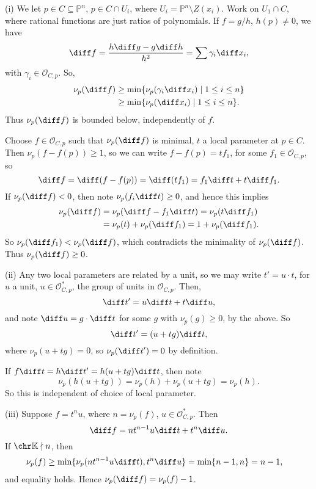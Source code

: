 \documentclass[12pt]{article}
\begin{document}
\begin{proofbox}
	(i) We let $p \in C \subseteq \mathbb{P}^n$, $p \in C \cap U_i$, where $U_i = \mathbb{P}^n \setminus Z(x_i)$. Work on $U_1 \cap C, $ where rational functions are just ratios of polynomials. If $f = g/h$, $h(p) \neq 0$, we have
	\[
	\diff f = \frac{h \diff g - g \diff h}{h^2} = \sum \gamma_i \diff x_i,
	\]
	with $\gamma_i \in \mathcal{O}_{C, p}$. So,
	\begin{align*}
		\nu_p(\diff f) & \geq \min\{ \nu_p(\gamma_i \diff x_i) \mid 1 \leq i \leq n\} \\
			       &\geq \min \{ \nu_p(\diff x_i) \mid 1 \leq i \leq n \}.
	\end{align*}
	Thus $\nu_p(\diff f)$ is bounded below, independently of $f$.

	Choose $f \in \mathcal{O}_{C, p}$ such that $\nu_p(\diff f)$ is minimal, $t$ a local parameter at $p \in C$. Then $\nu_p(f - f(p)) \geq 1$, so we can write $f - f(p) = t f_1$, for some $f_1 \in \mathcal{O}_{C, p}$, so
	\[
	\diff f=  \diff(f - f(p)) = \diff (t f_1) = f_1 \diff t + t \diff f_1.
	\]
	If $\nu_p(\diff f) < 0$, then note $\nu_p(f_i \diff t) \geq 0$, and hence this implies
	\begin{align*}
		\nu_p(\diff f) &= \nu_p(\diff f - f_1 \diff t) = \nu_p(t \diff f_1) \\
			       &= \nu_p(t) + \nu_p(\diff f_1) = 1 + \nu_p(\diff f_1).
	\end{align*}
	So $\nu_p( \diff f_1) < \nu_p (\diff f)$, which contradicts the minimality of $\nu_p(\diff f)$. Thus $\nu_p(\diff f) \geq 0$.

	(ii) Any two local parameters are related by a unit, so we may write $t' = u \cdot t$, for $u$ a unit, $u \in \mathcal{O}_{C, p}^\ast$, the group of units in $\mathcal{O}_{C, p}$. Then,
	\[
	\diff t' = u \diff t + t \diff u,
	\]
	and note $\diff u = g \cdot \diff t$ for some $g$ with $\nu_p(g) \geq 0$, by the above. So
	\[
	\diff t' = (u + t g) \diff t,
	\]
	where $\nu_p(u + tg) = 0$, so $\nu_p(\diff t') = 0$ by definition.

	If $f \diff t = h \diff t' = h(u + tg) \diff t$, then note
	\[
	\nu_p(h(u + tg)) = \nu_p(h) + \nu_p(u + tg) = \nu_p(h).
	\]
	So this is independent of choice of local parameter.

	(iii) Suppose $f = t^n u$, where $n = \nu_p(f)$, $u \in \mathcal{O}_{C, p}^\ast$. Then
	\[
	\diff f = n t^{n-1} u \diff t + t^n \diff u.
	\]
	If $\chr \mathbb{K} \nmid n$, then
	\begin{align*}
		\nu_p(f) &\geq \min \{ \nu_p(n t^{n-1} u \diff t), t^n \diff u \} = \min\{n-1, n\} = n-1,
	\end{align*}
	and equality holds. Hence $\nu_p(\diff f) = \nu_p(f) - 1$.
\end{proofbox}
\end{document}
